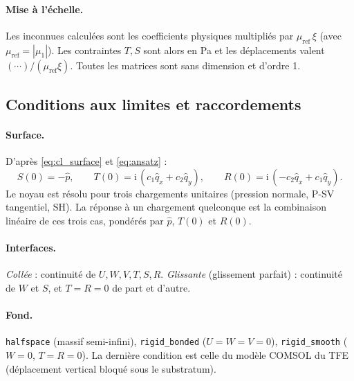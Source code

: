 \documentclass[11pt,a4paper]{article}
\newcommand{\ii}{\mathrm{i}}
\newcommand{\hatt}[1]{\widehat{#1}}
\begin{document}
\paragraph{Mise à l'échelle.} Les inconnues calculées sont les coefficients physiques multipliés
par $\mu_{\text{ref}}\,\xi$ (avec $\mu_{\text{ref}}=|\mu_1|$). Les contraintes $T,S$ sont alors en
Pa et les déplacements valent $(\cdots)/(\mu_{\text{ref}}\xi)$. Toutes les matrices sont sans
dimension et d'ordre 1.

\subsection{Conditions aux limites et raccordements}
\paragraph{Surface.} D'après \eqref{eq:cl_surface} et \eqref{eq:ansatz} :
\begin{equation}
S(0)=-\hatt p,\qquad T(0)=\ii\,(c_1\hatt q_x+c_2\hatt q_y),\qquad R(0)=\ii\,(-c_2\hatt q_x+c_1\hatt q_y).
\end{equation}
Le noyau est résolu pour trois chargements unitaires (pression normale, P-SV tangentiel, SH).
La réponse à un chargement quelconque est la combinaison linéaire de ces trois cas, pondérés par
$\hatt p$, $T(0)$ et $R(0)$.
\paragraph{Interfaces.} \emph{Collée} : continuité de $U,W,V,T,S,R$.
\emph{Glissante} (glissement parfait) : continuité de $W$ et $S$, et $T=R=0$ de part et d'autre.
\paragraph{Fond.} \texttt{halfspace} (massif semi-infini), \texttt{rigid\_bonded} ($U=W=V=0$),
\texttt{rigid\_smooth} ($W=0$, $T=R=0$). La dernière condition est celle du modèle COMSOL du TFE
(déplacement vertical bloqué sous le substratum).
\end{document}

